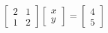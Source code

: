 \documentclass[preview]{standalone}
\begin{document}
\begin{align*}
\begin{bmatrix} 2 & 1 \\ 1 & 2 \end{bmatrix} \begin{bmatrix} x \\ y \end{bmatrix} = \begin{bmatrix} 4 \\ 5 \end{bmatrix}
\end{align*}
\end{document}
